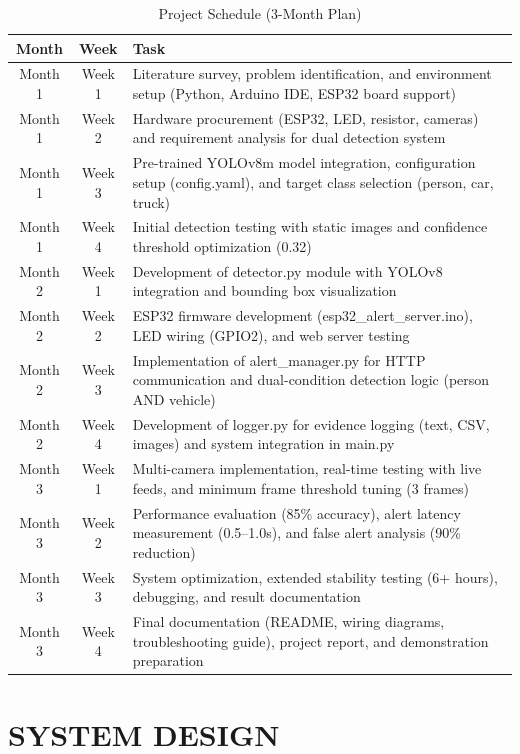 \documentclass[a4paper, 12pt]{report}
\begin{document}
\begin{table}[H]
\centering
\caption{Project Schedule (3-Month Plan)}
\begin{tabular}{|c|c|p{10cm}|}
\hline
\textbf{Month} & \textbf{Week} & \textbf{Task} \\ 
\hline
Month 1 & Week 1 & Literature survey, problem identification, and environment setup (Python, Arduino IDE, ESP32 board support) \\ 
\hline
Month 1 & Week 2 & Hardware procurement (ESP32, LED, resistor, cameras) and requirement analysis for dual detection system \\ 
\hline
Month 1 & Week 3 & Pre-trained YOLOv8m model integration, configuration setup (config.yaml), and target class selection (person, car, truck) \\ 
\hline
Month 1 & Week 4 & Initial detection testing with static images and confidence threshold optimization (0.32) \\ 
\hline
Month 2 & Week 1 & Development of detector.py module with YOLOv8 integration and bounding box visualization \\ 
\hline
Month 2 & Week 2 & ESP32 firmware development (esp32\_alert\_server.ino), LED wiring (GPIO2), and web server testing \\ 
\hline
Month 2 & Week 3 & Implementation of alert\_manager.py for HTTP communication and dual-condition detection logic (person AND vehicle) \\ 
\hline
Month 2 & Week 4 & Development of logger.py for evidence logging (text, CSV, images) and system integration in main.py \\ 
\hline
Month 3 & Week 1 & Multi-camera implementation, real-time testing with live feeds, and minimum frame threshold tuning (3 frames) \\ 
\hline
Month 3 & Week 2 & Performance evaluation (85\% accuracy), alert latency measurement (0.5--1.0s), and false alert analysis (90\% reduction) \\ 
\hline
Month 3 & Week 3 & System optimization, extended stability testing (6+ hours), debugging, and result documentation \\ 
\hline
Month 3 & Week 4 & Final documentation (README, wiring diagrams, troubleshooting guide), project report, and demonstration preparation \\ 
\hline
\end{tabular}
\label{tab:project_schedule}
\end{table}


\chapter{SYSTEM DESIGN}
\end{document}
